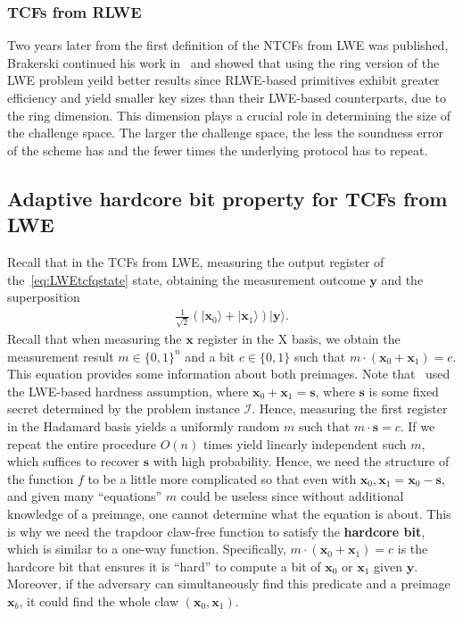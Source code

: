 \documentclass[cryptography,review,submit,pdftex,moreauthors,amsmath,amssymb,aps,strict]{Definitions/mdpi}
\begin{document}
\subsubsection{TCFs from RLWE}
Two years later from the first definition of the NTCFs from LWE was published, Brakerski continued his work in~\cite{BrakerskiProofofQuantumness} and showed that using the ring version of the LWE problem yeild better results since RLWE-based primitives exhibit greater efficiency and yield smaller key sizes than their LWE-based counterparts, due to the ring dimension. This dimension plays a crucial role in determining the size of the challenge space. The larger the challenge space, the less the soundness error of the scheme has and the fewer times the underlying protocol has to repeat. 



\subsection{Adaptive hardcore bit property for TCFs from LWE}

Recall that in the TCFs from LWE, measuring the output register of the~\eqref{eq:LWEtcfqstate} state, obtaining the measurement outcome $\mathbf{y}$ and the superposition
\begin{align}
    \frac{1}{\sqrt{2}}(|\mathbf{x}_0\rangle +|\mathbf{x}_1\rangle)|\mathbf{y}\rangle.\label{eq:lwetfcstate}
\end{align}
\noindent Recall that when measuring the $\mathbf{x}$ register in the X basis, we obtain the measurement result $m\in\{0,1\}^n$ and a bit $c\in\{0,1\}$ such that $m\cdot(\mathbf{x}_0+\mathbf{x}_1) = c$. This equation provides some information about both preimages. Note that~\cite{Brakerski18_Interactiveproofofquantumness} used the LWE-based hardness assumption, where $\mathbf{x}_0 + \mathbf{x}_1 = \mathbf{s}$, where $\mathbf{s}$ is some fixed secret determined by the problem instance $\mathcal{I}$. Hence, measuring the first register in the Hadamard basis yields a uniformly random $m$ such that $m\cdot \mathbf{s} = c$. If we repeat the entire procedure $O(n)$ times yield linearly independent such $m$, which suffices to recover $\mathbf{s}$ with high probability. Hence, we need the structure of the function $f$ to be a little more complicated so that even with $\mathbf{x}_0, \mathbf{x}_1 =\mathbf{x}_0- \mathbf{s}$, and given many ``equations'' $m$ could be useless since without additional knowledge of a preimage, one cannot determine what the equation is about. This is why we need the trapdoor claw-free function to satisfy the \textbf{hardcore bit}, which is similar to a one-way function. Specifically, $m\cdot(\mathbf{x}_0+\mathbf{x}_1) = c$ is the hardcore bit that ensures it is ``hard'' to compute a bit of $\mathbf{x}_0$ or $\mathbf{x}_1$ given $\mathbf{y}$. Moreover, if the adversary can simultaneously find this predicate and a preimage $\mathbf{x}_b$, it could find the whole claw $(\mathbf{x}_0, \mathbf{x}_1)$.
\end{document}
